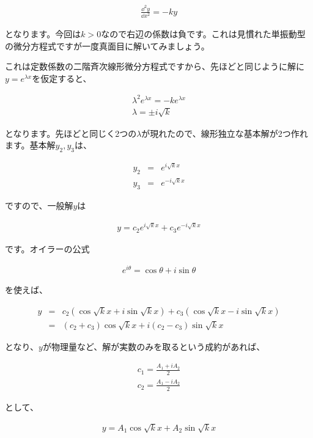 \begin{eqnarray}
    \frac{\dd^2y}{\dd x^2}=-ky
\end{eqnarray}

\noindent
となります。今回は$k>0$なので右辺の係数は負です。これは見慣れた単振動型の微分方程式ですが一度真面目に解いてみましょう。

これは定数係数の二階斉次線形微分方程式ですから、先ほどと同じように解に$y=e^{\lambda x}$を仮定すると、

\begin{eqnarray}
    \lambda^2e^{\lambda x}=-ke^{\lambda x} \\
    \lambda=\pm i\sqrt{k}
\end{eqnarray}

\noindent
となります。先ほどと同じく2つの$\lambda$が現れたので、線形独立な基本解が2つ作れます。基本解$y_2,y_3$は、

\begin{eqnarray}
    y_2&=&e^{i\sqrt{k}x} \\
    y_3&=&e^{-i\sqrt{k}x}
\end{eqnarray}

\noindent
ですので、一般解$y$は

\begin{eqnarray}
    y=c_2e^{i\sqrt{k}x}+c_3e^{-i\sqrt{k}x}
\end{eqnarray}

\noindent
です。オイラーの公式

\begin{eqnarray}
    e^{i\theta}=\cos\theta+i\sin\theta
\end{eqnarray}

を使えば、

\begin{eqnarray}
    y&=&c_2(\cos\sqrt{k}x+i\sin\sqrt{k}x)+c_3(\cos\sqrt{k}x-i\sin\sqrt{k}x) \nonumber \\
    &=&(c_2+c_3)\cos\sqrt{k}x+i(c_2-c_3)\sin\sqrt{k}x
\end{eqnarray}

となり、$y$が物理量など、解が実数のみを取るという成約があれば、

\begin{eqnarray}
    c_1=\frac{A_1+iA_2}{2} \\
    c_2=\frac{A_1-iA_2}{2}
\end{eqnarray}

\noindent
として、

\begin{eqnarray}
    y=A_1\cos\sqrt{k}x+A_2\sin\sqrt{k}x
\end{eqnarray}

